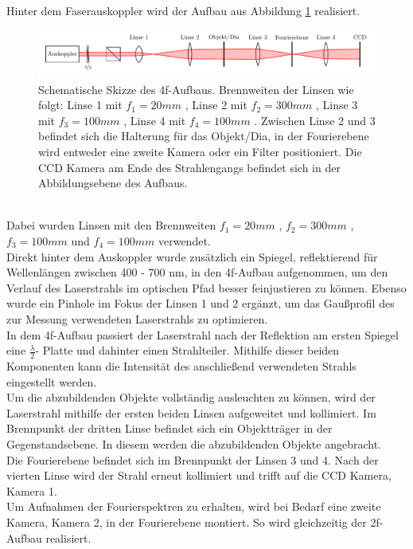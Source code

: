 

Hinter dem Faserauskoppler wird der Aufbau aus Abbildung \ref{fig:4f-aufbau} realisiert. \\

\begin{figure}[h]
\centering
\includegraphics[width=0.7\linewidth]{graphs/versuchsaufbau/4f-aufbau}
\caption{Schematische Skizze des 4f-Aufbaus. Brennweiten der Linsen wie folgt: Linse 1 mit $f_{1}=20mm$ , Linse 2 mit $f_{2}=300mm$ , Linse 3 mit $f_{3}=100mm$ , Linse 4 mit $f_{4}=100mm$ . Zwischen Linse 2 und 3 befindet sich die Halterung für das Objekt/Dia, in der Fourierebene wird entweder eine zweite Kamera oder ein Filter positioniert. Die CCD Kamera am Ende des Strahlengangs befindet sich in der Abbildungsebene des Aufbaus.}
\label{fig:4f-aufbau}
\end{figure}
\\
Dabei wurden Linsen mit den Brennweiten $f_{1}=20mm$ , $f_{2}=300mm$ , $f_{3}=100mm$ und $f_{4}=100mm$ verwendet. \\
Direkt hinter dem Auskoppler wurde zusätzlich ein Spiegel, reflektierend für Wellenlängen zwischen 400 - 700 nm, in den 4f-Aufbau aufgenommen, um den Verlauf des Laserstrahls im optischen Pfad besser feinjustieren zu können. Ebenso wurde ein Pinhole im Fokus der Linsen 1 und 2 ergänzt, um das Gaußprofil des zur Messung verwendeten Laserstrahls zu optimieren. \\

In dem 4f-Aufbau passiert der Laserstrahl nach der Reflektion am ersten Spiegel eine $\frac{\lambda}{2}$- Platte und dahinter einen Strahlteiler. Mithilfe dieser beiden Komponenten kann die Intensität des anschließend verwendeten Strahls eingestellt werden. \\
Um die abzubildenden Objekte vollständig ausleuchten zu können, wird der Laserstrahl mithilfe der ersten beiden Linsen aufgeweitet und kollimiert. Im Brennpunkt der dritten Linse befindet sich ein Objektträger in der Gegenstandsebene. In diesem werden die abzubildenden Objekte angebracht. \\
Die Fourierebene befindet sich im Brennpunkt der Linsen 3 und 4. Nach der vierten Linse wird der Strahl erneut kollimiert und trifft auf die CCD Kamera, Kamera 1. \\
Um Aufnahmen der Fourierspektren zu erhalten, wird bei Bedarf eine zweite Kamera, Kamera 2, in der Fourierebene montiert. So wird gleichzeitig der 2f-Aufbau realisiert. \\ 

